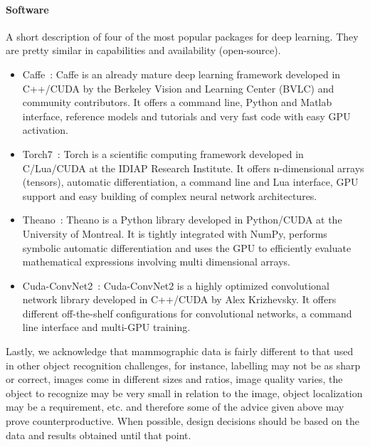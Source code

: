 \paragraph{Software}A short description of four of the most popular packages for deep learning. They are pretty similar in capabilities and availability (open-source).

\begin{itemize}
	\item Caffe~\cite{Jia2014}: Caffe is an already mature deep learning framework developed in C++/CUDA by the Berkeley Vision and Learning Center (BVLC) and community contributors. It offers a command line, Python and Matlab interface, reference models and tutorials and very fast code with easy GPU activation.
	\item Torch7~\cite{Collobert2011}: Torch is a scientific computing framework developed in C/Lua/CUDA at the IDIAP Research Institute. It offers n-dimensional arrays (tensors), automatic differentiation, a command line and Lua interface, GPU support and easy building of complex neural network architectures.
	\item Theano~\cite{Bergstra2010, Bastien2012}: Theano is a Python library developed in Python/CUDA at the University of Montreal. It is tightly integrated with NumPy, performs symbolic automatic differentiation and uses the GPU to efficiently evaluate mathematical expressions involving multi dimensional arrays.
	\item Cuda-ConvNet2~\cite{Krizhevsky2014}: Cuda-ConvNet2 is a highly optimized convolutional network library developed in C++/CUDA by Alex Krizhevsky. It offers different off-the-shelf configurations for convolutional networks, a command line interface and multi-GPU training.
\end{itemize}

\bigskip

Lastly, we acknowledge that mammographic data is fairly different to that used in other object recognition challenges, for instance, labelling may not be as sharp or correct, images come in different sizes and ratios, image quality varies, the object to recognize may be very small in relation to the image, object localization may be a requirement, etc. and therefore some of the advice given above may prove counterproductive. When possible, design decisions should be based on the data and results obtained until that point.


